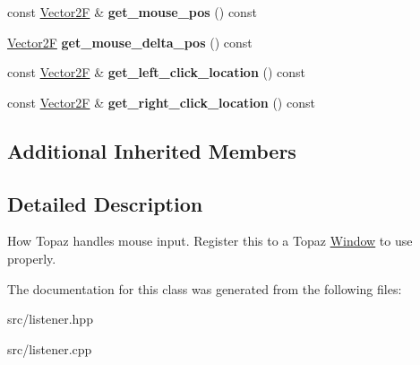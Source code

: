 \begin{DoxyCompactItemize}
const \mbox{\hyperlink{class_vector2}{Vector2F}} \& {\bfseries get\+\_\+mouse\+\_\+pos} () const
\item 
\mbox{\label{class_mouse_listener_aa10d9b159941d5297fe4e814ad529524}} 
\mbox{\hyperlink{class_vector2}{Vector2F}} {\bfseries get\+\_\+mouse\+\_\+delta\+\_\+pos} () const
\item 
\mbox{\label{class_mouse_listener_a1d3c6616b0fe7bdf8f0c31f8cf22ab71}} 
const \mbox{\hyperlink{class_vector2}{Vector2F}} \& {\bfseries get\+\_\+left\+\_\+click\+\_\+location} () const
\item 
\mbox{\label{class_mouse_listener_a93adff4448210ac95d7aaf870082987d}} 
const \mbox{\hyperlink{class_vector2}{Vector2F}} \& {\bfseries get\+\_\+right\+\_\+click\+\_\+location} () const
\end{DoxyCompactItemize}
\subsection*{Additional Inherited Members}


\subsection{Detailed Description}
How Topaz handles mouse input. Register this to a Topaz \mbox{\hyperlink{class_window}{Window}} to use properly. 

The documentation for this class was generated from the following files\+:\begin{DoxyCompactItemize}
\item 
src/listener.\+hpp\item 
src/listener.\+cpp\end{DoxyCompactItemize}
